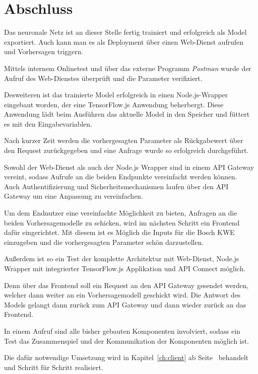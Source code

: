 \section{Abschluss}
Das neuronale Netz ist an dieser Stelle fertig trainiert und erfolgreich als Model exportiert. Auch kann man es als
Deployment über einen Web-Dienst aufrufen und Vorhersagen triggern.

Mittels internem Onlinetest und über das externe Programm \textit{Postman} wurde der Aufruf des Web-Dienstes überprüft
und die Parameter verifiziert.

Desweiteren ist das trainierte Model erfolgreich in einen Node.js-Wrapper eingebaut worden, der eine TensorFlow.js
Anwendung beherbergt. Diese Anwendung lädt beim Ausführen das aktuelle Model in den Speicher und füttert es mit den
Eingabevariablen.

Nach kurzer Zeit werden die vorhergesagten Parameter als Rückgabewert über den Request zurückgegeben und eine Anfrage
wurde so erfolgreich durchgeführt.

Sowohl der Web-Dienst als auch der Node.js Wrapper sind in einem API Gateway vereint, sodass Aufrufe an die beiden
Endpunkte vereinfacht werden können. Auch Authentifizierung und Sicherheitsmechanismen laufen über den API Gateway um
eine Anpassung zu vereinfachen.

Um dem Endnutzer eine vereinfachte Möglichkeit zu bieten, Anfragen an die beiden Vorhersagemodelle zu schicken, wird
im nächsten Schritt ein Frontend dafür eingerichtet. Mit diesem ist es Möglich die Inputs für die Bosch KWE einzugeben
und die vorhergesagten Parameter schön darzustellen.

Außerdem ist so ein Test der komplette Architektur mit Web-Dienst, Node.js Wrapper mit integrierter TensorFlow.js
Applikation und API Connect möglich.

Denn über das Frontend soll ein Request an den API Gateway gesendet werden, welcher dann weiter an ein Vorhersagemodell
geschickt wird. Die Antwort des Models gelangt dann zurück zum API Gateway und dann wieder zurück an das Frontend.

In einem Aufruf sind alle bisher gebauten Komponenten involviert, sodass ein Test das Zusammenspiel und der
Kommunikation der Komponenten möglich ist.

Die dafür notwendige Umsetzung wird in Kapitel~\ref{ch:client} ab Seite~\pageref{ch:client} behandelt und Schritt für
Schritt realisiert.